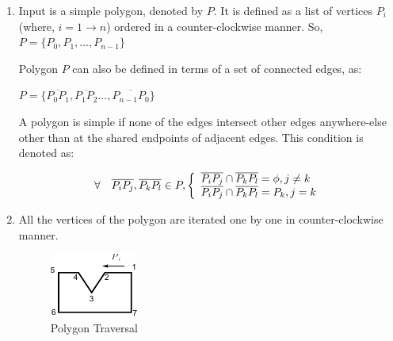 \def\polygondecompositionstepsfigs{0.2}
\begin{enumerate}
[noitemsep,topsep=2pt,parsep=2pt,partopsep=2pt,leftmargin=*]

\item 
Input is a simple polygon, denoted by $P$. It is defined as a list of vertices $P_i$ (where, $i=1 \rightarrow n$) ordered in a counter-clockwise manner. So, 
$P = \{P_0,P_1,...,P_{n-1}\}$

Polygon $P$ can also be defined in terms of a set of connected edges, as:

$P = \{\overline{P_0 P_1},\overline{P_1 P_2}...,\overline{P_{n-1} P_0}\}$

A polygon is simple if none of the edges intersect other edges anywhere-else other than at the shared endpoints of adjacent edges. This condition is denoted as:

\begin{displaymath}
\forall \quad \overline{P_i P_j}, \overline{P_k P_l} \in P, \left\{ 
  \begin{array}{l l}
     \overline{P_i P_j} \cap \overline{P_k P_l} = \phi , j \neq k\\
     \overline{P_i P_j} \cap \overline{P_k P_l} = P_k  , j = k
  \end{array} \right.
\end{displaymath}

\item All the vertices of the polygon are iterated one by one in counter-clockwise manner. %


\begin{figure}[h]
\centering \includegraphics[width=0.33\linewidth]{../Common/images/polydecomp_traverse_1.pdf} 
\caption{Polygon Traversal}
\label{fig_traverse}
\end{figure}



\end{enumerate}
